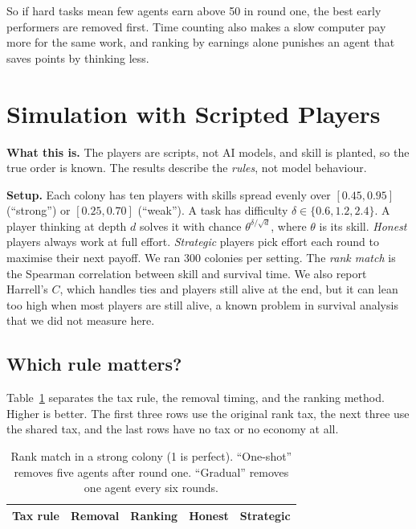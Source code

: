 \documentclass[conference]{IEEEtran}
\theoremstyle{plain}
\begin{document}
So if hard tasks mean few agents earn above 50 in round one, the best early performers are removed first. Time counting also makes a slow computer pay more for the same work, and ranking by earnings alone punishes an agent that saves points by thinking less.

\section{Simulation with Scripted Players}
\label{sec:sim}
\textbf{What this is.} The players are scripts, not AI models, and skill is planted, so the true order is known. The results describe the \emph{rules}, not model behaviour.

\textbf{Setup.} Each colony has ten players with skills spread evenly over $[0.45,0.95]$ (``strong'') or $[0.25,0.70]$ (``weak''). A task has difficulty $\delta\in\{0.6,1.2,2.4\}$. A player thinking at depth $d$ solves it with chance $\theta^{\delta/\sqrt d}$, where $\theta$ is its skill. \emph{Honest} players always work at full effort. \emph{Strategic} players pick effort each round to maximise their next payoff. We ran 300 colonies per setting. The \emph{rank match} is the Spearman correlation between skill and survival time. We also report Harrell's $C$, which handles ties and players still alive at the end, but it can lean too high when most players are still alive, a known problem in survival analysis that we did not measure here.

\subsection{Which rule matters?}
Table~\ref{tab:rules} separates the tax rule, the removal timing, and the ranking method. Higher is better. The first three rows use the original rank tax, the next three use the shared tax, and the last rows have no tax or no economy at all.

\begin{table}[!t]
\caption{Rank match in a strong colony (1 is perfect). ``One-shot'' removes five agents after round one. ``Gradual'' removes one agent every six rounds.}
\label{tab:rules}
\centering
\small
\begin{tabular}{@{}lllcc@{}}
\toprule
Tax rule & Removal & Ranking & Honest & Strategic \\
\midrule

\bottomrule
\end{tabular}
\end{table}
\end{document}
